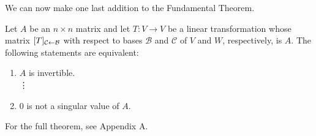 \documentclass[../m73main.tex]{subfiles}
\begin{document}
We can now make one last addition to the Fundamental Theorem.

\begin{theorem}
	Let $A$ be an $n\times n$ matrix and let $T : V \to V$ be a linear transformation whose matrix $[T]_{\mathcal{C} \leftarrow \mathcal{B}}$ with respect to bases $\mathcal{B}$ and $\mathcal{C}$ of $V$ and $W$, respectively, is $A$.
	The following statements are equivalent:
	\begin{enumerate}[label=(\alph*)]
		\item $A$ is invertible. \\
		\phantom{~}\hspace{-19.5pt} \vdots
		\setcounter{enumi}{20}
		\item 0 is not a singular value of $A$.
	\end{enumerate}
	For the full theorem, see Appendix A.
\end{theorem}
\end{document}
